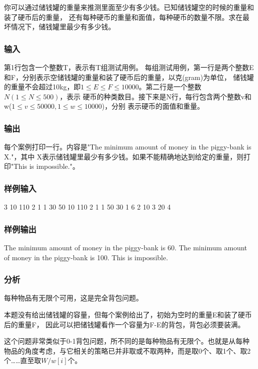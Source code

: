 你可以通过储钱罐的重量来推测里面至少有多少钱。已知储钱罐空的时候的重量和装了硬币后的重量，
还有每种硬币的重量和面值，每种硬币的数量不限。求在最坏情况下，储钱罐里最少有多少钱。

\subsubsection{输入}
第1行包含一个整数T，表示有T组测试用例。
每组测试用例，第一行是两个整数E和F，分别表示空储钱罐的重量和装了硬币后的重量，以克(gram)为单位，
储钱罐的重量不会超过10kg，即$1 \leq E \leq F \leq 10000$。第二行是一个整数$N(1 \leq N \leq 500)$，表示
硬币的种类数目。接下来是N行，每行包含两个整数v和w($1 \leq v \leq 50000, 1 \leq w \leq 10000$)，分别
表示硬币的面值和重量。

\subsubsection{输出}
每个案例打印一行。内容是"The minimum amount of money in the piggy-bank is X."，其中
X表示储钱罐里最少有多少钱。如果不能精确地达到给定的重量，则打印"This is impossible."。

\subsubsection{样例输入}
\begin{Code}
3
10 110
2
1 1
30 50
10 110
2
1 1
50 30
1 6
2
10 3
20 4
\end{Code}

\subsubsection{样例输出}
\begin{Code}
The minimum amount of money in the piggy-bank is 60.
The minimum amount of money in the piggy-bank is 100.
This is impossible.
\end{Code}

\subsubsection{分析}
每种物品有无限个可用，这是完全背包问题。

本题没有给出储钱罐的容量，但每个案例给出了，初始为空时的重量E和装了硬币后的重量F，
因此可以把储钱罐看作一个容量为F-E的背包，背包必须要装满。

这个问题非常类似于0-1背包问题，所不同的是每种物品有无限个。也就是从每种
物品的角度考虑，与它相关的策略已并非取或不取两种，而是取0个、取1个、取2
个……直至取$W/w[i]$个。

